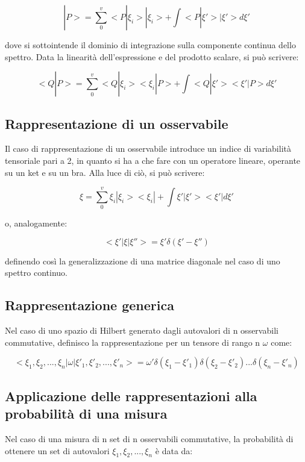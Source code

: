 \documentclass{article}
\begin{document}
\begin{equation}
    |P>= \sum_{0}^{v} <P|\xi_i>|\xi_i>+ \int <P|\xi'>|\xi'>d\xi'
\end{equation}

dove si sottointende il dominio di integrazione sulla componente continua dello spettro.
Data la linearità dell'espressione e del prodotto scalare, si può scrivere:

\begin{equation}
    <Q|P>= \sum_{0}^{v} <Q|\xi_i><\xi_i|P>+ \int <Q|\xi'><\xi'|P>d\xi'
\end{equation}


\subsection{Rappresentazione di un osservabile}
Il caso di rappresentazione di un osservabile introduce un indice di variabilità tensoriale pari a 2, in quanto si ha a che fare con un operatore lineare, operante su un ket e su un bra.
Alla luce di ciò, si può scrivere:

\begin{equation}
    \xi = \sum_{0}^{v} \xi_i|\xi_i><\xi_i|+ \int \xi'|\xi'><\xi'|d\xi'
\end{equation}

o, analogamente:

\begin{equation}
    <\xi' | \xi | \xi''>= \xi' \delta(\xi'-\xi'')
\end{equation}

definendo così la generalizzazione di una matrice diagonale nel caso di uno spettro continuo.

\subsection{Rappresentazione generica}

Nel caso di uno spazio di Hilbert generato dagli autovalori di n osservabili commutative, definisco la rappresentazione per 
un tensore di rango n $\omega$ come:

\begin{equation}
    <\xi_1,\xi_2,...,\xi_n|\omega|\xi'_1,\xi'_2,...,\xi'_n> = \omega' \delta(\xi_1-\xi'_1)\delta(\xi_2-\xi'_2)...\delta(\xi_n-\xi'_n)
\end{equation}


\subsection{Applicazione delle rappresentazioni alla probabilità di una misura}
Nel caso di una misura di n set di n osservabili commutative, la probabilità di ottenere un set di autovalori $\xi_1,\xi_2,...,\xi_n$ è data da:
\end{document}
